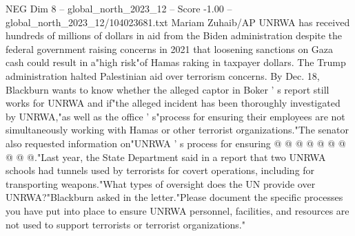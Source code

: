 \begin{textsample}{NEG Dim 8 – global\_north\_2023\_12 – Score -1.00 – global\_north\_2023\_12/104023681.txt}
Mariam Zuhaib/AP UNRWA has received hundreds of millions of dollars in aid from the Biden administration despite the federal government raising concerns in 2021 that loosening sanctions on Gaza cash could result in a"high risk"of Hamas raking in taxpayer dollars.
The Trump administration halted Palestinian aid over terrorism concerns.
By Dec. 18, Blackburn wants to know whether the alleged captor in Boker ' s report still works for UNRWA and if"the alleged incident has been thoroughly investigated by UNRWA,"as well as the office ' s"process for ensuring their employees are not simultaneously working with Hamas or other terrorist organizations."The senator also requested information on"UNRWA ' s process for ensuring @ @ @ @ @ @ @ @ @ @."Last year, the State Department said in a report that two UNRWA schools had tunnels used by terrorists for covert operations, including for transporting weapons."What types of oversight does the UN provide over UNRWA?"Blackburn asked in the letter."Please document the specific processes you have put into place to ensure UNRWA personnel, facilities, and resources are not used to support terrorists or terrorist organizations."

\end{textsample}
